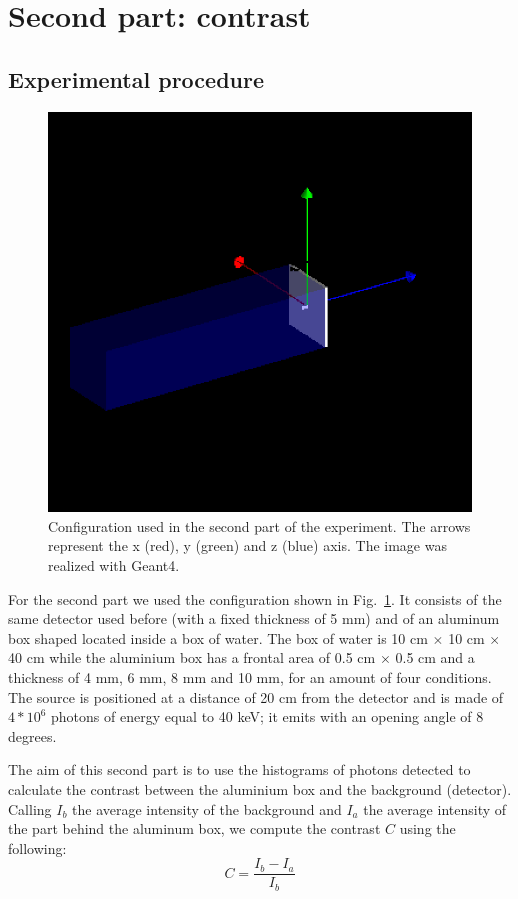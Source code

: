 \documentclass[a4paper]{article}
\begin{document}
\section{Second part: contrast}
\subsection{Experimental procedure}
\begin{figure}[H]
  \centering
  \includegraphics[width=0.6\columnwidth]{detector2.png}
  \caption{Configuration used in the second part of the experiment. The arrows represent the x (red), y (green) and z (blue) axis. The image was realized with Geant4.}
  \label{fig:conf2}
\end{figure}
For the second part we used the configuration shown in Fig.~\ref{fig:conf2}. It consists of the same detector used before (with a fixed thickness of 5 mm) and of an aluminum box shaped located inside a box of water. The box of water is 10 cm $\times$ 10 cm $\times$ 40 cm while the aluminium box has a frontal area of 0.5 cm $\times$ 0.5 cm and a thickness of 4 mm, 6 mm, 8 mm and 10 mm, for an amount of four conditions. The source is positioned at a distance of 20 cm from the detector and is made of $4*10^{6}$ photons of energy equal to 40 keV; it emits with an opening angle of 8 degrees.

The aim of this second part is to use the histograms of photons detected to calculate the contrast between the aluminium box and the background (detector). Calling $I_{b}$ the average intensity of the background and $I_{a}$ the average intensity of the part behind the aluminum box, we compute the contrast $C$ using the following:
\begin{equation}
  C=\frac{I_{b}-I_{a}}{I_{b}}
  \label{eq:contrast}
\end{equation}
\end{document}
